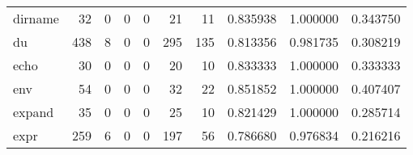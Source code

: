 \begin{tabular}{lrrrrrrrrr}
dirname   &                                        32 &                                                  0 &                                                  0 &                                                  0 &                                                 21 &                                                 11 &                                           0.835938 &                               1.000000 &                             0.343750 \\
du        &                                       438 &                                                  8 &                                                  0 &                                                  0 &                                                295 &                                                135 &                                           0.813356 &                               0.981735 &                             0.308219 \\
echo      &                                        30 &                                                  0 &                                                  0 &                                                  0 &                                                 20 &                                                 10 &                                           0.833333 &                               1.000000 &                             0.333333 \\
env       &                                        54 &                                                  0 &                                                  0 &                                                  0 &                                                 32 &                                                 22 &                                           0.851852 &                               1.000000 &                             0.407407 \\
expand    &                                        35 &                                                  0 &                                                  0 &                                                  0 &                                                 25 &                                                 10 &                                           0.821429 &                               1.000000 &                             0.285714 \\
expr      &                                       259 &                                                  6 &                                                  0 &                                                  0 &                                                197 &                                                 56 &                                           0.786680 &                               0.976834 &                             0.216216 \\

\end{tabular}

